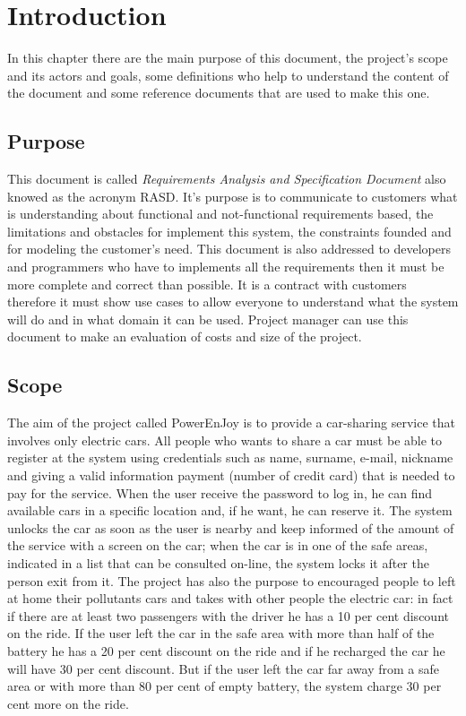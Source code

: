 \section{Introduction} \label{sec:intro}
In this chapter there are the main purpose of this document, the project's scope and its actors and goals, some definitions who help to understand the content of the document and some reference documents that are used to make this one. 

\subsection{Purpose} \label{subsec:purpose}
This document is called \emph{Requirements Analysis and Specification Document} also knowed as the acronym RASD. It's purpose is to communicate to customers what is understanding about functional and not-functional requirements based, the limitations and obstacles for implement this system, the constraints founded and for modeling the customer's need. This document is also addressed to developers and programmers who have to implements all the requirements then it must be more complete and correct than possible. It is a contract with customers therefore it must show use cases to allow everyone to understand what the system will do and in what domain it can be used. Project manager can use this document to make an evaluation of costs and size of the project.


\subsection{Scope} \label{subsec:scope}
The aim of the project called PowerEnJoy is to provide a car-sharing service that involves only electric cars. All people who wants to share a car must be able to register at the system using credentials such as name, surname, e-mail, nickname and giving a valid information payment (number of credit card) that is needed to pay for the service. When the user receive the password to log in, he can find available cars in a specific location and, if he want, he can reserve it. The system unlocks the car as soon as the user is nearby and keep informed of the amount of the service with a screen on the car; when the car is in one of the safe areas, indicated in a list that can be consulted on-line, the system locks it after the person exit from it. The project has also the purpose to encouraged people to left at home their pollutants cars and takes with other people the electric car: in fact if there are at least two passengers with the driver he has a 10 per cent discount on the ride. If the user left the car in the safe area with more than half of the battery he has a 20 per cent discount on the ride and if he recharged the car he will have 30 per cent discount. But if the user left the car far away from a safe area or with more than 80 per cent of empty battery, the system charge 30 per cent more on the ride.

